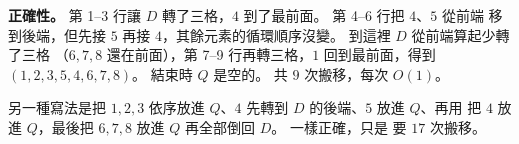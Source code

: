 \begin{pastsoln}
\textbf{正確性。} 第 1--3 行讓 $D$ 轉了三格，$4$ 到了最前面。 第 4--6 行把 $4$、$5$ 從前端
移到後端，但先接 $5$ 再接 $4$，其餘元素的循環順序沒變。 到這裡 $D$ 從前端算起少轉了三格
（$6, 7, 8$ 還在前面），第 7--9 行再轉三格，$1$ 回到最前面，得到 $(1, 2, 3, 5, 4, 6, 7, 8)$。
結束時 $Q$ 是空的。 共 $9$ 次搬移，每次 $O(1)$。

另一種寫法是把 $1, 2, 3$ 依序放進 $Q$、$4$ 先轉到 $D$ 的後端、$5$ 放進 $Q$、再用
 把 $4$ 放進 $Q$，最後把 $6, 7, 8$ 放進 $Q$ 再全部倒回 $D$。 一樣正確，只是
要 $17$ 次搬移。
\end{pastsoln}
